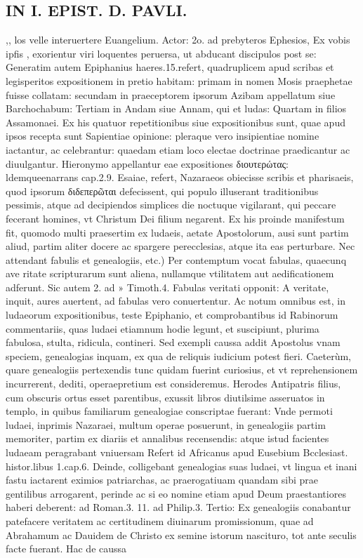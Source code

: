 \documentclass{article}
\begin{document}
\begin{pages}
\section*{IN I. EPIST. D. PAVLI. }
\marginpar{[ p.8 ]}
\marginpar{[ p.9 ]}
\marginpar{[ p.10 ]}
\marginpar{[ p.11 ]}
\marginpar{[ p.12 ]}
\marginpar{[ p.13 ]}\pstart ,, los velle interuertere Euangelium. Actor: 2o. ad prebyteros Ephesios, Ex vobis ipfis , exorientur viri loquentes peruersa, ut abducant discipulos post se: Generatim autem Epiphanius haeres.15.refert, quadruplicem apud scribas et legisperitos expositionem in pretio habitam: primam in nomen Mosis praephetae fuisse collatam: secundam in praeceptorem ipsorum Azibam appellatum siue Barchochabum: Tertiam in Andam siue Annam, qui et ludas: Quartam in filios Assamonaei. Ex his quatuor repetitionibus siue expositionibus sunt, quae apud ipsos recepta sunt Sapientiae opinione: pleraque  vero insipientiae nomine iactantur, ac celebrantur: quaedam etiam loco electae doctrinae praedicantur ac diuulgantur. Hieronymo appellantur eae expositiones διουτερώτας: ldemqueenarrans cap.2.9. Esaiae, refert, Nazaraeos obiecisse scribis et pharisaeis, quod ipsorum διδεπερῶται defecissent, qui populo illuserant traditionibus pessimis, atque  ad decipiendos simplices die noctuque  vigilarant, qui peccare fecerant homines, vt Christum Dei filium negarent. Ex his proinde manifestum fit, quomodo multi praesertim ex ludaeis, aetate Apostolorum, ausi sunt partim aliud, partim aliter docere ac spargere perecclesias, atque  ita eas perturbare.  \pend\pstart Nec attendant fabulis et genealogiis, etc.) Per contemptum vocat fabulas, quaecunq ave ritate scripturarum sunt aliena, nullamque  vtilitatem aut aedificationem adferunt. Sic autem 2. ad » Timoth.4. Fabulas veritati opponit: A veritate, inquit, aures auertent, ad fabulas vero conuertentur. Ac notum omnibus est, in ludaeorum expositionibus, teste Epiphanio, et comprobantibus id Rabinorum commentariis, quas ludaei etiamnum hodie legunt, et suscipiunt, plurima fabulosa, stulta, ridicula, contineri. Sed exempli caussa addit Apostolus vnam speciem, genealogias inquam, ex qua de reliquis iudicium potest fieri.  \pend\pstart Caeterùm, quare genealogiis pertexendis tunc quidam fuerint curiosius, et vt reprehensionem incurrerent, dediti, operaepretium est consideremus.  \pend\pstart Herodes Antipatris filius, cum obscuris ortus esset parentibus, exussit libros diutilsime asseruatos in templo, in quibus familiarum genealogiae conscriptae fuerant: Vnde permoti ludaei, inprimis Nazaraei, multum operae posuerunt, in genealogiis partim memoriter, partim ex diariis et annalibus recensendis: atque  istud facientes ludaeam peragrabant vniuersam Refert id Africanus apud Eusebium Bcclesiast. histor.libus 1.cap.6.  \pend\pstart Deinde, colligebant genealogias suas ludaei, vt lingua et inani fastu iactarent eximios patriarchas, ac praerogatiuam quandam sibi prae gentilibus arrogarent, perinde ac si eo nomine etiam apud Deum praestantiores haberi deberent: ad Roman.3. 11. ad Philip.3. Tertio: Ex genealogiis conabantur patefacere veritatem ac certitudinem diuinarum promissionum, quae ad Abrahamum ac Dauidem de Christo ex semine istorum nascituro, tot ante seculis facte fuerant. Hac de caussa 
\end{pages}
\end{document}
